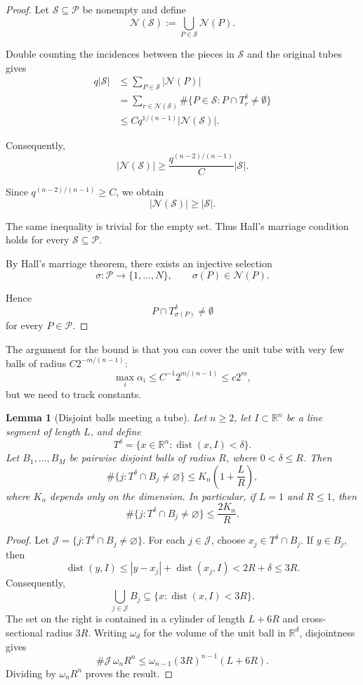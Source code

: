 \documentclass[11pt, letterpaper]{nyjm}
\newtheorem{lemma}[theorem]{Lemma}
\begin{document}
\begin{proof}
	Let $\mathcal S\subseteq\mathcal P$ be nonempty and define
	\[
	\mathcal N(\mathcal S)
	:=
	\bigcup_{P\in\mathcal S}\mathcal N(P).
	\]
	
	Double counting the incidences between the pieces
	in $\mathcal S$ and the original tubes gives
	\[
	\begin{aligned}
		q|\mathcal S|
		&\le \sum_{P\in\mathcal S}|\mathcal N(P)|\\
		&=
		\sum_{r\in\mathcal N(\mathcal S)}
		\#\{P\in\mathcal S:
		P\cap T_r^\delta\neq\emptyset\}\\
		&\le
		Cq^{1/(n-1)}|\mathcal N(\mathcal S)|.
	\end{aligned}
	\]
	
	Consequently,
	\[
	\boxed{
		|\mathcal N(\mathcal S)|
		\ge
		\frac{q^{(n-2)/(n-1)}}{C}
		|\mathcal S|.
	}
	\]
	
	Since $q^{(n-2)/(n-1)}\ge C$, we obtain
	\[
	|\mathcal N(\mathcal S)|\ge|\mathcal S|.
	\]
	
	The same inequality is trivial for the empty set.
	Thus Hall's marriage condition holds for every
	$\mathcal S\subseteq\mathcal P$.
	
	By Hall's marriage theorem, there exists an
	injective selection
	\[
	\sigma:\mathcal P\longrightarrow\{1,\ldots,N\},
	\qquad
	\sigma(P)\in\mathcal N(P).
	\]
	
	Hence
	\[
	P\cap T_{\sigma(P)}^\delta\neq\emptyset
	\]
	for every $P\in\mathcal P$.
\end{proof}
The argument for the bound is that you can cover the unit tube with very few balls of radius $C2^{-m/(n-1)}$: 
\[
\max_i \alpha_i \leq C^{-1}2^{m/(n-1)} \leq c2^{m},
\]
but we need to track constants.
\begin{lemma}[Disjoint balls meeting a tube]
	Let $n\ge2$, let $I\subset\mathbb{R}^n$ be a line segment
	of length $L$, and define
	\[
	T^\delta=\{x\in\mathbb{R}^n:\operatorname{dist}(x,I)<\delta\}.
	\]
	Let $B_1,\ldots,B_M$ be pairwise disjoint balls of radius $R$,
	where $0<\delta\le R$. Then
	\[
	\#\{j:T^\delta\cap B_j\ne\varnothing\}
	\le K_n\left(1+\frac{L}{R}\right),
	\]
	where $K_n$ depends only on the dimension.
	In particular, if $L=1$ and $R\le1$, then
	\[
	\#\{j:T^\delta\cap B_j\ne\varnothing\}\le \frac{2K_n}{R}.
	\]
\end{lemma}

\begin{proof}
	Let $\mathcal{J}=\{j:T^\delta\cap B_j\ne\varnothing\}$.
	For each $j\in\mathcal{J}$, choose $x_j\in T^\delta\cap B_j$.
	If $y\in B_j$, then
	\[
	\operatorname{dist}(y,I)
	\le |y-x_j|+\operatorname{dist}(x_j,I)
	<2R+\delta\le3R.
	\]
	Consequently,
	\[
	\bigcup_{j\in\mathcal{J}}B_j
	\subseteq\{x:\operatorname{dist}(x,I)<3R\}.
	\]
	The set on the right is contained in a cylinder of length
	$L+6R$ and cross-sectional radius $3R$.
	Writing $\omega_d$ for the volume of the unit ball in
	$\mathbb{R}^d$, disjointness gives
	\[
	\#\mathcal{J}\,\omega_n R^n
	\le \omega_{n-1}(3R)^{n-1}(L+6R).
	\]
	Dividing by $\omega_n R^n$ proves the result.
\end{proof}
\end{document}
